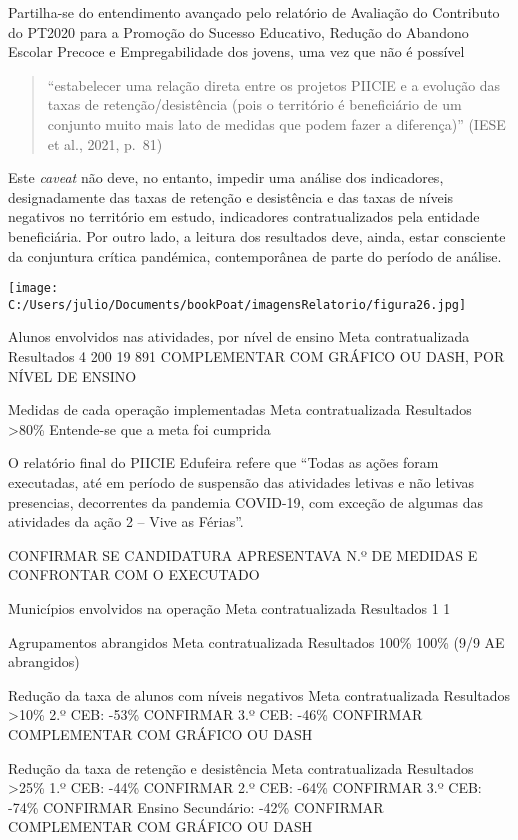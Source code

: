 \documentclass[
]{book}
\begin{document}
Partilha-se do entendimento avançado pelo relatório de Avaliação do Contributo do PT2020 para a Promoção do Sucesso Educativo, Redução do Abandono Escolar Precoce e Empregabilidade dos jovens, uma vez que não é possível

\begin{quote}
``estabelecer uma relação direta entre os projetos PIICIE e a evolução das taxas de retenção/desistência (pois o território é beneficiário de um conjunto muito mais lato de medidas que podem fazer a diferença)'' (IESE et al., 2021, p.~81)
\end{quote}

Este \emph{caveat} não deve, no entanto, impedir uma análise dos indicadores, designadamente das taxas de retenção e desistência e das taxas de níveis negativos no território em estudo, indicadores contratualizados pela entidade beneficiária. Por outro lado, a leitura dos resultados deve, ainda, estar consciente da conjuntura crítica pandémica, contemporânea de parte do período de análise.

\texttt{[image: C:/Users/julio/Documents/bookPoat/imagensRelatorio/figura26.jpg]}

Alunos envolvidos nas atividades, por nível de ensino
Meta contratualizada Resultados
4 200 19 891
COMPLEMENTAR COM GRÁFICO OU DASH, POR NÍVEL DE ENSINO

Medidas de cada operação implementadas
Meta contratualizada Resultados
\textgreater80\% Entende-se que a meta foi cumprida

O relatório final do PIICIE Edufeira refere que ``Todas as ações foram executadas, até em período de suspensão das atividades letivas e não letivas presencias, decorrentes da pandemia COVID-19, com exceção de algumas das atividades da ação 2 -- Vive as Férias''.

CONFIRMAR SE CANDIDATURA APRESENTAVA N.º DE MEDIDAS E CONFRONTAR COM O EXECUTADO

Municípios envolvidos na operação
Meta contratualizada Resultados
1 1

Agrupamentos abrangidos
Meta contratualizada Resultados
100\% 100\% (9/9 AE abrangidos)

Redução da taxa de alunos com níveis negativos
Meta contratualizada Resultados\\
\textgreater10\% 2.º CEB: -53\% CONFIRMAR
3.º CEB: -46\% CONFIRMAR
COMPLEMENTAR COM GRÁFICO OU DASH

Redução da taxa de retenção e desistência
Meta contratualizada Resultados
\textgreater25\% 1.º CEB: -44\% CONFIRMAR
2.º CEB: -64\% CONFIRMAR
3.º CEB: -74\% CONFIRMAR
Ensino Secundário: -42\% CONFIRMAR
COMPLEMENTAR COM GRÁFICO OU DASH
\end{document}
